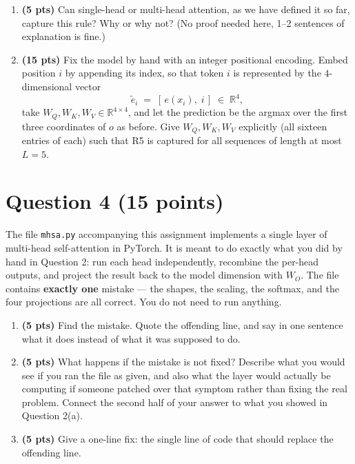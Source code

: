 \documentclass[11pt]{article}
\newcommand{\emb}[1]{\ensuremath{e(#1)}}
\newcommand{\Wq}{\ensuremath{W_Q}}
\newcommand{\Wk}{\ensuremath{W_K}}
\newcommand{\Wv}{\ensuremath{W_V}}
\begin{document}
\begin{enumerate}[label=(\alph*)]

  \item \textbf{(5 pts)} Can single-head or multi-head attention, as we have defined it so far, capture this
  rule? Why or why not? (No proof needed here, 1--2 sentences of explanation is fine.)

  \item \textbf{(15 pts)} Fix the model by hand with an integer positional encoding. Embed position $i$ by
  appending its index, so that token $i$ is represented by the $4$-dimensional vector
  \[
  \tilde{e}_i \;=\; [\,\emb{x_i},\; i\,] \;\in\; \mathbb{R}^4 ,
  \]
  take $\Wq, \Wk, \Wv \in \mathbb{R}^{4\times 4}$, and let the prediction be the argmax over the
  first three coordinates of $o$ as before. Give $\Wq, \Wk, \Wv$ explicitly (all sixteen entries of each)
  such that R5 is captured for all sequences of length at most $L = 5$.




\end{enumerate}

\section{Question 4 (15 points)}

The file \texttt{mhsa.py} accompanying this assignment implements a single layer of multi-head self-attention in
PyTorch. It is meant to do exactly what you did by hand in Question 2: run each head independently, recombine
the per-head outputs, and project the result back to the model dimension with $W_O$. The file contains
\textbf{exactly one} mistake --- the shapes, the scaling, the softmax, and the four projections are all
correct. You do not need to run anything.

\begin{enumerate}[label=(\alph*)]

  \item \textbf{(5 pts)} Find the mistake. Quote the offending line, and say in one sentence what it does
  instead of what it was supposed to do.

  \item \textbf{(5 pts)} What happens if the mistake is not fixed? Describe what you would see if you ran the
  file as given, and also what the layer would actually be computing if someone patched over that symptom
  rather than fixing the real problem. Connect the second half of your answer to what you showed in
  Question 2(a).

  \item \textbf{(5 pts)} Give a one-line fix: the single line of code that should replace the offending line.

\end{enumerate}
\end{document}
